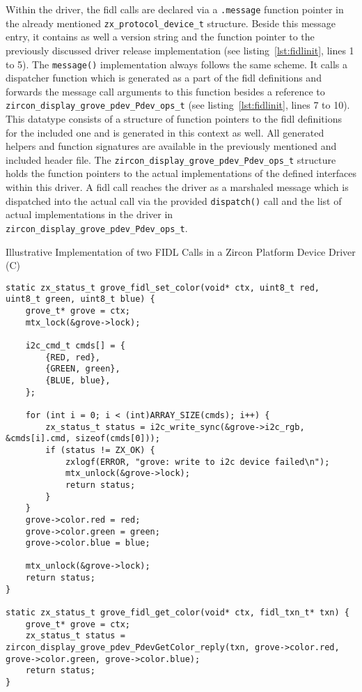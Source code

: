 Within the driver, the \ac{fidl} calls are declared via a \texttt{.message} function pointer in the already mentioned \texttt{zx_protocol_device_t} structure.
Beside this message entry, it contains as well a version string and the function pointer to the previously discussed driver release implementation (see listing~\ref{lst:fidlinit}, lines 1 to 5).
The \texttt{message()} implementation always follows the same scheme.
It calls a dispatcher function which is generated as a part of the \ac{fidl} definitions and forwards the message call arguments to this function besides a reference to \texttt{zircon_display_grove_pdev_Pdev_ops_t} (see listing~\ref{lst:fidlinit}, lines 7 to 10).
This datatype consists of a structure of function pointers to the \ac{fidl} definitions for the included one and is generated in this context as well. 
All generated helpers and function signatures are available in the previously mentioned and included header file.
The \texttt{zircon_display_grove_pdev_Pdev_ops_t} structure holds the function pointers to the actual implementations of the defined interfaces within this driver.
A \ac{fidl} call reaches the driver as a marshaled message which is dispatched into the actual call via the provided \texttt{dispatch()} call and the list of actual implementations in the driver in \texttt{zircon_display_grove_pdev_Pdev_ops_t}.
%
\begin{listing} [H]
    \caption{Illustrative Implementation of two FIDL Calls in a Zircon Platform Device Driver (C)}
\label{lst:fidlimpl}
\begin{verbatim}
static zx_status_t grove_fidl_set_color(void* ctx, uint8_t red, uint8_t green, uint8_t blue) {
    grove_t* grove = ctx;
    mtx_lock(&grove->lock);

    i2c_cmd_t cmds[] = {
        {RED, red},
        {GREEN, green},
        {BLUE, blue},
    };

    for (int i = 0; i < (int)ARRAY_SIZE(cmds); i++) {
        zx_status_t status = i2c_write_sync(&grove->i2c_rgb, &cmds[i].cmd, sizeof(cmds[0]));
        if (status != ZX_OK) {
            zxlogf(ERROR, "grove: write to i2c device failed\n");
            mtx_unlock(&grove->lock);
            return status;
        }
    }
    grove->color.red = red;
    grove->color.green = green;
    grove->color.blue = blue;

    mtx_unlock(&grove->lock);
    return status;
}

static zx_status_t grove_fidl_get_color(void* ctx, fidl_txn_t* txn) {
    grove_t* grove = ctx;
    zx_status_t status = zircon_display_grove_pdev_PdevGetColor_reply(txn, grove->color.red, grove->color.green, grove->color.blue);
    return status;
}
\end{verbatim}
\end{listing}
